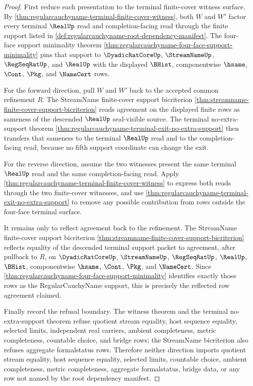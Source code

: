 \begin{proof}
First reduce each presentation to the terminal finite-cover witness surface. By \autoref{thm:regularcauchyname-terminal-finite-cover-witness}, both $W$ and $W'$ factor every terminal $\RealUp$ read and completion-facing read through the finite support listed in \autoref{def:regularcauchyname-root-dependency-manifest}. The four-face support minimality theorem \autoref{thm:regularcauchyname-four-face-support-minimality} pins that support to $\DyadicRatCoreUp$, $\StreamNameUp$, $\RegSeqRatUp$, and $\RealUp$ with the displayed $\BHist$, componentwise $\hsame$, $\Cont$, $\Pkg$, and $\NameCert$ rows.

For the forward direction, pull $W$ and $W'$ back to the accepted common refinement $R$. The StreamName finite-cover support bicriterion \autoref{thm:streamname-finite-cover-support-bicriterion} reads agreement on the displayed finite rows as sameness of the descended $\RealUp$ seal-visible source. The terminal no-extra-support theorem \autoref{thm:regularcauchyname-terminal-exit-no-extra-support} then transfers that sameness to the terminal $\RealUp$ read and to the completion-facing read, because no fifth support coordinate can change the exit.

For the reverse direction, assume the two witnesses present the same terminal $\RealUp$ read and the same completion-facing read. Apply \autoref{thm:regularcauchyname-terminal-finite-cover-witness} to express both reads through the two finite-cover witnesses, and use \autoref{thm:regularcauchyname-terminal-exit-no-extra-support} to remove any possible contribution from rows outside the four-face terminal surface.

It remains only to reflect agreement back to the refinement. The StreamName finite-cover support bicriterion \autoref{thm:streamname-finite-cover-support-bicriterion} reflects equality of the descended terminal support packet to agreement, after pullback to $R$, on $\DyadicRatCoreUp$, $\StreamNameUp$, $\RegSeqRatUp$, $\RealUp$, $\BHist$, componentwise $\hsame$, $\Cont$, $\Pkg$, and $\NameCert$. Since \autoref{thm:regularcauchyname-four-face-support-minimality} identifies exactly those rows as the RegularCauchyName support, this is precisely the reflected row agreement claimed.

Finally record the refusal boundary. The witness theorem and the terminal no-extra-support theorem refuse quotient stream equality, host sequence equality, selected limits, independent real carriers, ambient completeness, metric completeness, countable choice, and bridge rows; the StreamName bicriterion also refuses aggregate formalstatus rows. Therefore neither direction imports quotient stream equality, host sequence equality, selected limits, countable choice, ambient completeness, metric completeness, aggregate formalstatus, bridge data, or any row not named by the root dependency manifest.
\end{proof}
